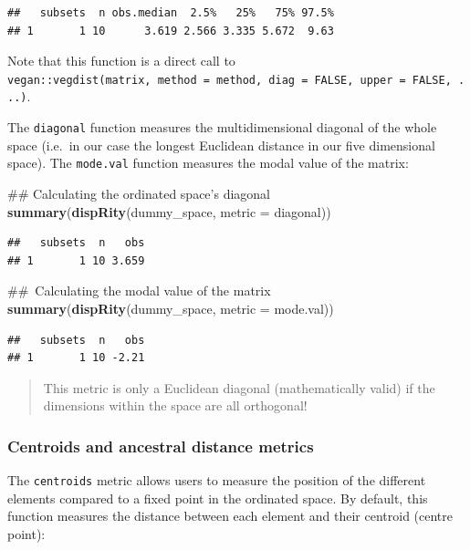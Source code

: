 \documentclass[]{book}
\newenvironment{Shaded}{\begin{snugshade}}{\end{snugshade}}
\newcommand{\KeywordTok}[1]{\textcolor[rgb]{0.13,0.29,0.53}{\textbf{#1}}}
\newcommand{\DataTypeTok}[1]{\textcolor[rgb]{0.13,0.29,0.53}{#1}}
\newcommand{\NormalTok}[1]{#1}
\theoremstyle{definition}
\theoremstyle{definition}
\theoremstyle{remark}
\begin{document}
\begin{verbatim}
##   subsets  n obs.median  2.5%   25%   75% 97.5%
## 1       1 10      3.619 2.566 3.335 5.672  9.63
\end{verbatim}

Note that this function is a direct call to
\texttt{vegan::vegdist(matrix,\ method\ =\ method,\ diag\ =\ FALSE,\ upper\ =\ FALSE,\ ...)}.

The \texttt{diagonal} function measures the multidimensional diagonal of
the whole space (i.e.~in our case the longest Euclidean distance in our
five dimensional space). The \texttt{mode.val} function measures the
modal value of the matrix:

\begin{Shaded}
\begin{Highlighting}[]
\NormalTok{## Calculating the ordinated space's diagonal}
\KeywordTok{summary}\NormalTok{(}\KeywordTok{dispRity}\NormalTok{(dummy_space, }\DataTypeTok{metric =}\NormalTok{ diagonal))}
\end{Highlighting}
\end{Shaded}

\begin{verbatim}
##   subsets  n   obs
## 1       1 10 3.659
\end{verbatim}

\begin{Shaded}
\begin{Highlighting}[]
\NormalTok{## Calculating the modal value of the matrix}
\KeywordTok{summary}\NormalTok{(}\KeywordTok{dispRity}\NormalTok{(dummy_space, }\DataTypeTok{metric =}\NormalTok{ mode.val))}
\end{Highlighting}
\end{Shaded}

\begin{verbatim}
##   subsets  n   obs
## 1       1 10 -2.21
\end{verbatim}

\begin{quote}
This metric is only a Euclidean diagonal (mathematically valid) if the
dimensions within the space are all orthogonal!
\end{quote}

\subsubsection{Centroids and ancestral distance
metrics}\label{centroids-and-ancestral-distance-metrics}

The \texttt{centroids} metric allows users to measure the position of
the different elements compared to a fixed point in the ordinated space.
By default, this function measures the distance between each element and
their centroid (centre point):
\end{document}
